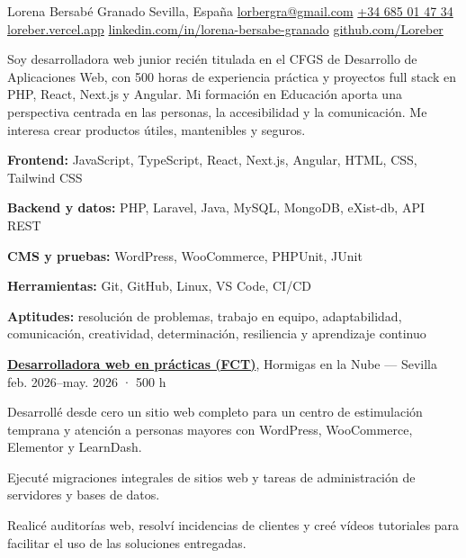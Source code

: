 \documentclass[10pt]{article}
\begin{document}
\cvheader
  {Lorena Bersabé Granado}
  {Sevilla, España \quad\AND\quad
   \href{mailto:lorbergra@gmail.com}{lorbergra@gmail.com} \quad\AND\quad
   \href{tel:+34685014734}{+34 685 01 47 34} \quad\AND\quad
   \href{https://loreber.vercel.app}{loreber.vercel.app}}
  {\href{https://www.linkedin.com/in/lorena-bersabe-granado}{linkedin.com/in/lorena-bersabe-granado}
   \quad\AND\quad
   \href{https://github.com/Loreber}{github.com/Loreber}}

\vspace{-0.3cm}

Soy desarrolladora web junior recién titulada en el CFGS de Desarrollo de Aplicaciones Web, con 500 horas de experiencia práctica y proyectos full stack en PHP, React, Next.js y Angular. Mi formación en Educación aporta una perspectiva centrada en las personas, la accesibilidad y la comunicación. Me interesa crear productos útiles, mantenibles y seguros.

\begin{skilllist}
  \item \textbf{Frontend:} JavaScript, TypeScript, React, Next.js, Angular, HTML, CSS, Tailwind CSS
  \item \textbf{Backend y datos:} PHP, Laravel, Java, MySQL, MongoDB, eXist-db, API REST
  \item \textbf{CMS y pruebas:} WordPress, WooCommerce, PHPUnit, JUnit
  \item \textbf{Herramientas:} Git, GitHub, Linux, VS Code, CI/CD
  \item \textbf{Aptitudes:} resolución de problemas, trabajo en equipo, adaptabilidad, comunicación, creatividad, determinación, resiliencia y aprendizaje continuo
\end{skilllist}

\textbf{\underline{Desarrolladora web en prácticas (FCT)}}, Hormigas en la Nube --- Sevilla
\hfill feb. 2026--may. 2026 · 500 h

\entryspace
\begin{highlights}
  \item Desarrollé desde cero un sitio web completo para un centro de estimulación temprana y atención a personas mayores con WordPress, WooCommerce, Elementor y LearnDash.
  \item Ejecuté migraciones integrales de sitios web y tareas de administración de servidores y bases de datos.
  \item Realicé auditorías web, resolví incidencias de clientes y creé vídeos tutoriales para facilitar el uso de las soluciones entregadas.
\end{highlights}
\end{document}
